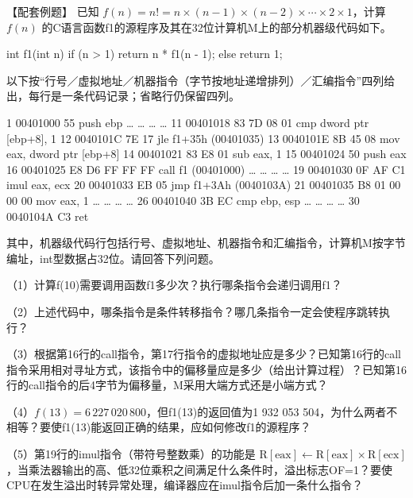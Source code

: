 \begin{example}[配套例题]

【配套例题】 已知 \(f(n)=n!=n\times(n-1)\times(n-2)\times\cdots\times2\times1\)，计算 \(f(n)\) 的C语言函数f1的源程序及其在32位计算机M上的部分机器级代码如下。

\par\medskip\noindent\begin{minipage}{\linewidth}
\begin{codeblock}[language=C]
int f1(int n) {
    if (n > 1)
        return n * f1(n - 1);
    else
        return 1;
}
\end{codeblock}
\end{minipage}\par\medskip

以下按``行号／虚拟地址／机器指令（字节按地址递增排列）／汇编指令''四列给出，每行是一条代码记录；省略行仍保留四列。

\par\medskip\noindent\begin{minipage}{\linewidth}
\begin{codeblock}[language={}]
 1  00401000  55              push ebp
 …  …         …               …
11  00401018  83 7D 08 01     cmp dword ptr [ebp+8], 1
12  0040101C  7E 17           jle f1+35h (00401035)
13  0040101E  8B 45 08        mov eax, dword ptr [ebp+8]
14  00401021  83 E8 01        sub eax, 1
15  00401024  50              push eax
16  00401025  E8 D6 FF FF FF  call f1 (00401000)
 …  …         …               …
19  00401030  0F AF C1        imul eax, ecx
20  00401033  EB 05           jmp f1+3Ah (0040103A)
21  00401035  B8 01 00 00 00  mov eax, 1
 …  …         …               …
26  00401040  3B EC           cmp ebp, esp
 …  …         …               …
30  0040104A  C3              ret
\end{codeblock}
\end{minipage}\par\medskip

其中，机器级代码行包括行号、虚拟地址、机器指令和汇编指令，计算机M按字节编址，int型数据占32位。请回答下列问题。

（1）计算f(10)需要调用函数f1多少次？执行哪条指令会递归调用f1？

（2）上述代码中，哪条指令是条件转移指令？哪几条指令一定会使程序跳转执行？

（3）根据第16行的call指令，第17行指令的虚拟地址应是多少？已知第16行的call指令采用相对寻址方式，该指令中的偏移量应是多少（给出计算过程）？已知第16行的call指令的后4字节为偏移量，M采用大端方式还是小端方式？

（4）\(f(13)=6\,227\,020\,800\)，但f1(13)的返回值为1 932 053 504，为什么两者不相等？要使f1(13)能返回正确的结果，应如何修改f1的源程序？

（5）第19行的imul指令（带符号整数乘）的功能是 \(\mathrm R[\mathrm{eax}]\leftarrow\mathrm R[\mathrm{eax}]\times\mathrm R[\mathrm{ecx}]\)，当乘法器输出的高、低32位乘积之间满足什么条件时，溢出标志OF=1？要使CPU在发生溢出时转异常处理，编译器应在imul指令后加一条什么指令？

\end{example}

